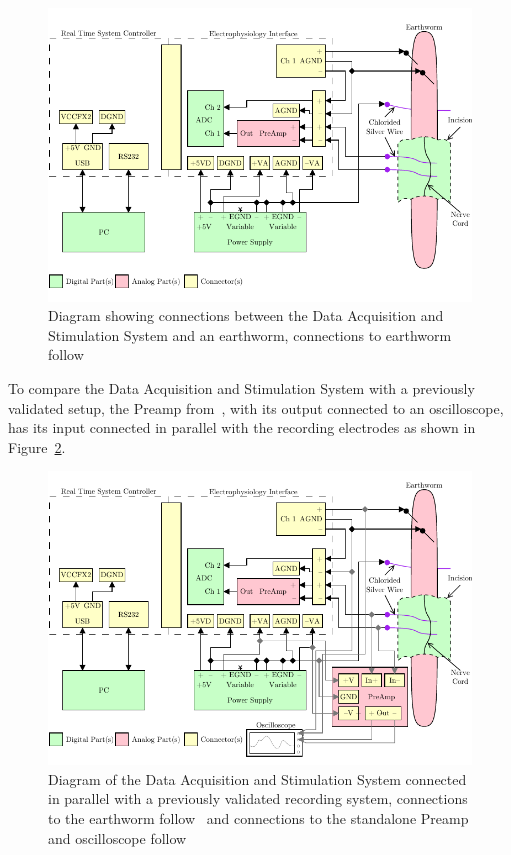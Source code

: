 \begin{figure}[H]
	\begin{singlespace}
	\centering 
		\includegraphics{./figures/EWSetup} 
	\caption{Diagram showing connections between the Data Acquisition and Stimulation System and an earthworm, connections to earthworm follow~\cite{Olivo,KuehJellies}\label{fig:EWSetup}}
	\end{singlespace}
\end{figure}

To compare the Data Acquisition and Stimulation System with a previously validated setup, the  Preamp from~\cite{StahlMSEE,BatzerCorsiCrampton}, with its output connected to an oscilloscope, has its input connected in parallel with the recording electrodes as shown in Figure~\ref{fig:EWSetupPA}.

\begin{figure}[H]
	\begin{singlespace}
	\centering 
		\includegraphics{./figures/EWSetupPA} 
	\caption{Diagram of the Data Acquisition and Stimulation System connected in parallel with a previously validated recording system, connections to the earthworm follow~\cite{Olivo,KuehJellies} and connections to the standalone Preamp and oscilloscope follow~\cite{StahlMSEE}\label{fig:EWSetupPA}}
	\end{singlespace}
\end{figure}

